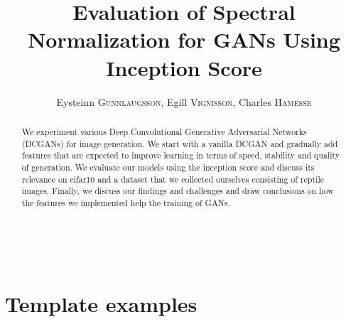 \documentclass[runningheads]{llncs}
\begin{document}
\pagestyle{headings}
\mainmatter

%
\def\ECCV16SubNumber{16}
\def\GroupNumber{16}
\title{Evaluation of Spectral Normalization for GANs Using Inception Score}
\author{Eysteinn \textsc{Gunnlaugsson},
	Egill \textsc{Vignisson},
	Charles \textsc{Hamesse}}
\institute{Group \GroupNumber}
\maketitle

%
\begin{abstract} We experiment various Deep Convolutional Generative Adversarial Networks (DCGANs) for image generation. We start with a vanilla DCGAN and gradually add features that are expected to improve learning in terms of speed, stability and quality of generation. We evaluate our models using the inception score and discuss its relevance on cifar10 and a dataset that we collected ourselves consisting of reptile images. Finally, we discuss our findings and challenges and draw conclusions on how the features we implemented help the training of GANs.
{}
\end{abstract}

%






%



%
~\\
\pagebreak
\appendix
\section{Template examples}
\end{document}
